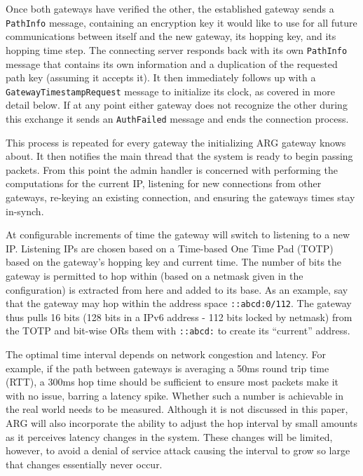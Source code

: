 \par Once both gateways have verified the other, the established gateway sends a \texttt{PathInfo} message, containing an encryption key it would like to use for all future communications between itself and the new gateway, its hopping key, and its hopping time step. The connecting server responds back with its own \texttt{PathInfo} message that contains its own information and a duplication of the requested path key (assuming it accepts it). It then immediately follows up with a \texttt{GatewayTimestampRequest} message to initialize its clock, as covered in more detail below. If at any point either gateway does not recognize the other during this exchange it sends an \texttt{AuthFailed} message and ends the connection process.

\par This process is repeated for every gateway the initializing ARG gateway knows about. It then notifies the main thread that the system is ready to begin passing packets. From this point the admin handler is concerned with performing the computations for the current IP, listening for new connections from other gateways, re-keying an existing connection, and ensuring the gateways times stay in-synch. %

\par At configurable increments of time the gateway will switch to listening to a new IP. Listening IPs are chosen based on a Time-based One Time Pad (TOTP) \cite{rfc6238} based on the gateway's hopping key and current time. The number of bits the gateway is permitted to hop within (based on a netmask given in the configuration) is extracted from here and added to its base. As an example, say that the gateway may hop within the address space \texttt{::abcd:0/112}. The gateway thus pulls 16 bits (128 bits in a IPv6 address - 112 bits locked by netmask) from the TOTP and bit-wise ORs them with \texttt{::abcd:} to create its ``current'' address.

\par The optimal time interval depends on network congestion and latency. For example, if the path between gateways is averaging a 50ms round trip time (RTT), a 300ms hop time should be sufficient to ensure most packets make it with no issue, barring a latency spike. Whether such a number is achievable in the real world needs to be measured. Although it is not discussed in this paper, ARG will also incorporate the ability to adjust the hop interval by small amounts as it perceives latency changes in the system. These changes will be limited, however, to avoid a denial of service attack causing the interval to grow so large that changes essentially never occur.


